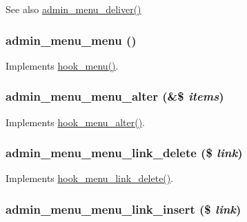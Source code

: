 \begin{DoxySeeAlso}{See also}
\hyperlink{admin__menu_8module_ab013e2c0ba08ba3bd0ea79bb9aa6518b}{admin\_\-menu\_\-deliver()} 
\end{DoxySeeAlso}
\hypertarget{admin__menu_8module_a890b6285791642bfa4420583457fb473}{
\subsubsection[{admin\_\-menu\_\-menu}]{\setlength{\rightskip}{0pt plus 5cm}admin\_\-menu\_\-menu ()}}
\label{admin__menu_8module_a890b6285791642bfa4420583457fb473}
Implements \hyperlink{group__hooks_ga5c95244fea59b25666e409759e133ded}{hook\_\-menu()}. \hypertarget{admin__menu_8module_a5215739b9f88a38d14ba99f5413b904e}{
\subsubsection[{admin\_\-menu\_\-menu\_\-alter}]{\setlength{\rightskip}{0pt plus 5cm}admin\_\-menu\_\-menu\_\-alter (\&\$ {\em items})}}
\label{admin__menu_8module_a5215739b9f88a38d14ba99f5413b904e}
Implements \hyperlink{group__hooks_ga4c37deddcf48dbfe6f3081df1652f6fa}{hook\_\-menu\_\-alter()}. \hypertarget{admin__menu_8module_a0fb7c76d79321ad3bc3cbb6566c455a2}{
\subsubsection[{admin\_\-menu\_\-menu\_\-link\_\-delete}]{\setlength{\rightskip}{0pt plus 5cm}admin\_\-menu\_\-menu\_\-link\_\-delete (\$ {\em link})}}
\label{admin__menu_8module_a0fb7c76d79321ad3bc3cbb6566c455a2}
Implements \hyperlink{group__hooks_gaf08037b21bd31aa8d2b12e988da7e2fb}{hook\_\-menu\_\-link\_\-delete()}. \hypertarget{admin__menu_8module_aa2fdb44794becd942d82791196fb3175}{
\subsubsection[{admin\_\-menu\_\-menu\_\-link\_\-insert}]{\setlength{\rightskip}{0pt plus 5cm}admin\_\-menu\_\-menu\_\-link\_\-insert (\$ {\em link})}}
